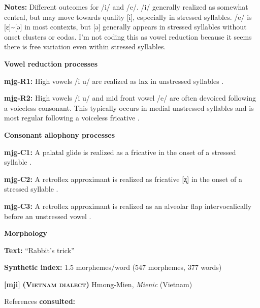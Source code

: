 \textbf{Notes:} Different outcomes for /i/ and /e/. /i/ generally realized as somewhat central, but may move towards quality [i], especially in stressed syllables. /e/ is [ɛ]{\textasciitilde}[ə] in most contexts, but [ə] generally appears in stressed syllables without onset clusters or codas. I’m not coding this as vowel reduction because it seems there is free variation even within stressed syllables.



\textbf{Vowel reduction processes}



\textbf{mjg-R1:} High vowels /i u/ are realized as lax in unstressed syllables \citep[35]{Slater2003}.



\textbf{mjg-R2:} High vowels /i u/ and mid front vowel /e/ are often devoiced following a voiceless consonant. This typically occurs in medial unstressed syllables and is most regular following a voiceless fricative \citep[36]{Slater2003}.



\textbf{Consonant allophony processes}



\textbf{mjg-C1:} A palatal glide is realized as a fricative in the onset of a stressed syllable \citep[31-2]{Slater2003}.



\textbf{mjg-C2:} A retroflex approximant is realized as fricative [ʐ] in the onset of a stressed syllable \citep[30]{Slater2003}.



\textbf{mjg-C3:} A retroflex approximant is realized as an alveolar flap intervocalically before an unstressed vowel \citep[31]{Slater2003}.



\textbf{Morphology}



\textbf{Text:} “Rabbit’s trick” \citep[343-350]{Slater2003}



\textbf{Synthetic index:} 1.5 morphemes/word (547 morphemes, 377 words)



\textbf{[mji]}   \textbf{\textsc{ (Vietnam dialect)}}  Hmong-Mien, \textit{Mienic} (Vietnam)



References \textbf{consulted:} \citet{Clark2008}



